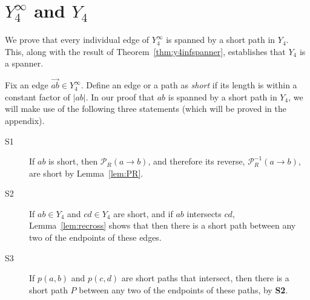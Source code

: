 \pdfoutput=1  \documentclass[11pt]{article}
\newcommand{\Pa}{{\mathcal P}}
\begin{document}
\section{$Y^\infty_4$ and $Y_4$}
\label{sec:Yinf+Y4}
We prove that every individual edge of $Y^\infty_4$ is spanned by a
short path in $Y_4$. This, along with the result of
Theorem~\ref{thm:y4infspanner}, establishes that $Y_4$ is a spanner.

Fix an edge $\overrightarrow{ab} \in Y_4^\infty$. Define an edge or
a path as \emph{short} if its length is within a constant factor
of $|ab|$. In our proof that $ab$ is spanned by a short path in
$Y_4$, we will make use of the following three statements
(which will be proved in the appendix).
\begin{description}
\item[S1]
If $ab$ is short, then $\Pa_R(a \rightarrow b)$,
and therefore its reverse, $\Pa_R^{-1}(a \rightarrow b)$,
are short by Lemma~\ref{lem:PR}.
\item[S2]
If $ab \in Y_4$ and $cd \in Y_4$ are short, and if
$ab$ intersects $cd$, Lemma~\ref{lem:recross} shows that
then there is a short path between any two of the endpoints
of these edges.
\item[S3]
If $p(a,b)$ and $p(c,d)$ are short paths that intersect,
then there is a short path $P$ between any two of the endpoints
of these paths, by {\bf S2}.
\end{description}
\end{document}
